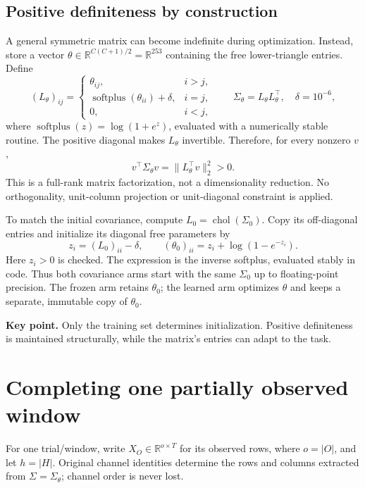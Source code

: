 \documentclass[11pt,a4paper]{article}
\newcommand{\R}{\mathbb R}
\newcommand{\spplus}{\operatorname{softplus}}
\newcommand{\takeaway}[1]{\par\smallskip\noindent\colorbox{pale}{\parbox{\dimexpr\linewidth-2\fboxsep\relax}{\textbf{Key point.} #1}}\par\smallskip}
\begin{document}
\subsection{Positive definiteness by construction}
A general symmetric matrix can become indefinite during optimization. Instead,
store a vector $\theta\in\R^{C(C+1)/2}=\R^{253}$ containing the free lower-triangle
entries. Define
\begin{equation}
 (L_\theta)_{ij}=
 \begin{cases}
  \theta_{ij}, & i>j,\\
  \spplus(\theta_{ii})+\delta, & i=j,\\
  0, & i<j,
 \end{cases}
 \qquad \Sigma_\theta=L_\theta L_\theta^\top,\quad\delta=10^{-6},
 \label{eq:spd}
\end{equation}
where $\spplus(z)=\log(1+e^z)$, evaluated with a numerically stable routine.
The positive diagonal makes $L_\theta$ invertible. Therefore, for every nonzero $v$,
\begin{equation}
 v^\top\Sigma_\theta v=\|L_\theta^\top v\|_2^2>0.
\end{equation}
This is a full-rank matrix factorization, not a dimensionality reduction.
No orthogonality, unit-column projection or unit-diagonal constraint is applied.

To match the initial covariance, compute $L_0=\operatorname{chol}(\Sigma_0)$.
Copy its off-diagonal entries and initialize its diagonal free parameters by
\begin{equation}
 z_i=(L_0)_{ii}-\delta,\qquad
 (\theta_0)_{ii}=z_i+\log(1-e^{-z_i}).
 \label{eq:inverse}
\end{equation}
Here $z_i>0$ is checked. The expression is the inverse softplus, evaluated
stably in code. Thus both covariance arms start with the same $\Sigma_0$ up
to floating-point precision. The frozen arm retains $\theta_0$; the learned
arm optimizes $\theta$ and keeps a separate, immutable copy of $\theta_0$.

\takeaway{Only the training set determines initialization. Positive definiteness
is maintained structurally, while the matrix's entries can adapt to the task.}

\newpage
\section{Completing one partially observed window}
For one trial/window, write $X_O\in\R^{o\times T}$ for its observed rows,
where $o=|O|$, and let $h=|H|$. Original channel identities determine the rows
and columns extracted from $\Sigma=\Sigma_\theta$; channel order is never lost.
\end{document}
